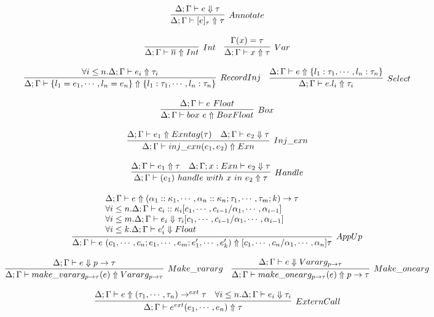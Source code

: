 \documentclass{article}
\begin{document}
$$
\infer[Annotate]{\Delta; \Gamma \vdash \Typed{e}{\tau} \Uparrow \tau}
{
	\Delta; \Gamma \vdash e \Downarrow \tau
}
$$

$$
\infer[Int]{\Delta; \Gamma \vdash \overline n \Uparrow \TInt}
{
}
\quad
\infer[Var]{\Delta; \Gamma \vdash x \Uparrow \tau}
{
	\Gamma(x) = \tau
}
$$

$$
\infer[RecordInj]{\Delta; \Gamma \vdash \RecordIntro{l_1 = e_1,\cdots,l_n = e_n} \Uparrow \Record{l_1: \tau_1,\cdots,l_n: \tau_n}}
{
	\forall i \leq n . \Delta; \Gamma \vdash e_i \Uparrow \tau_i
}
\quad
\infer[Select]{\Delta; \Gamma \vdash e.l_i \Uparrow \tau_i}
{
	\Delta; \Gamma \vdash e \Uparrow \Record{l_1: \tau_1,\cdots,l_n: \tau_n}
}
$$

$$
\infer[Box]{\Delta; \Gamma \vdash \Boxf{e} \Uparrow \BoxedFloat}
{
	\Delta; \Gamma \vdash e\ \Float
}
$$

$$
\infer[Inj\_exn]{\Delta; \Gamma \vdash \Injexn{e_1}{e_2} \Uparrow \Exn}
{
	\Delta; \Gamma \vdash e_1 \Uparrow \Exntag{\tau}
	\quad \Delta; \Gamma \vdash e_2 \Downarrow \tau
}
$$

$$
\infer[Handle]{\Delta; \Gamma \vdash \Handle{e_1}{x}{e_2} \Uparrow \tau}
{
	\Delta; \Gamma \vdash e_1 \Uparrow \tau
	\quad \Delta; \Gamma; x: \Exn \vdash e_2 \Downarrow \tau
}
$$

$$
\infer[AppUp]{\Delta; \Gamma \vdash \App{e}{c_1,\cdots,c_n}{e_1,\cdots,e_m}{e'_1,\cdots,e'_k} \Uparrow [c_1,\cdots,c_n/\alpha_1,\cdots,\alpha_n]\tau}
{
	\begin{array}{l}
		\Delta; \Gamma \vdash e \Uparrow \Arrow{\alpha_1::\kappa_1,\cdots,\alpha_n::\kappa_n}{\tau_1,\cdots,\tau_m}{k}{\tau} \\
		\forall i \leq n . \Delta; \Gamma \vdash c_i :: \kappa_i[c_1,\cdots,c_{i-1}/\alpha_1,\cdots,\alpha_{i-1}] \\
		\forall i \leq m . \Delta; \Gamma \vdash e_i \Downarrow \tau_i[c_1,\cdots,c_{i-1}/\alpha_1,\cdots,\alpha_{i-1}] \\
		\forall i \leq k . \Delta; \Gamma \vdash e'_i \Downarrow \Float
	\end{array}
}
$$

$$
\infer[Make\_vararg]{\Delta; \Gamma \vdash \Mkvararg{\PArrow{p}{\tau}}{e} \Uparrow \Vararg{p}{\tau}}
{
	\Delta; \Gamma \vdash e \Downarrow \PArrow{p}{\tau}
}
\quad
\infer[Make\_onearg]{\Delta; \Gamma \vdash \Mkonearg{\PArrow{p}{\tau}}{e} \Uparrow \PArrow{p}{\tau}}
{
	\Delta; \Gamma \vdash e \Downarrow \Vararg{p}{\tau}
}
$$

$$
\infer[ExternCall]{\Delta; \Gamma \vdash \ExternApp{e}{e_1,\cdots,e_n} \Uparrow \tau}
{
	\Delta; \Gamma \vdash e \Uparrow \ExternArrow{\tau_1,\cdots,\tau_n}{\tau}
	\quad \forall i \leq n . \Delta; \Gamma \vdash e_i \Downarrow \tau_i
}
$$
\end{document}
